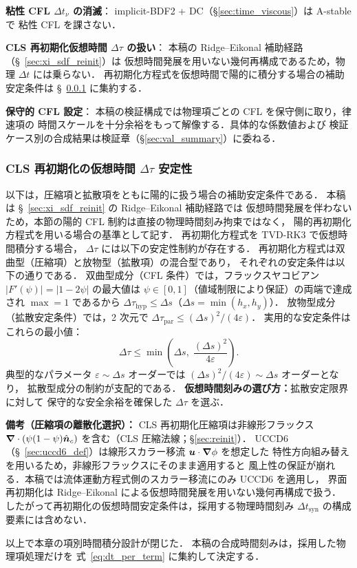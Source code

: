 \textbf{粘性 CFL $\Delta t_\nu$ の消滅}：
implicit-BDF2 + DC（§\ref{sec:time_viscous}）は A-stable で
粘性 CFL を課さない．

\textbf{CLS 再初期化仮想時間 $\Delta\tau$ の扱い}：
本稿の Ridge--Eikonal 補助経路（\S~\ref{sec:xi_sdf_reinit}）は
仮想時間発展を用いない幾何再構成であるため，物理 $\Delta t$ には乗らない．
再初期化方程式を仮想時間で陽的に積分する場合の補助安定条件は
\S~\ref{warn:cls_dtau_stability_v7} に集約する．

\textbf{保守的 CFL 設定}：
本稿の検証構成では物理項ごとの CFL を保守側に取り，律速項の
時間スケールを十分余裕をもって解像する．具体的な係数値および
検証ケース別の合成結果は検証章（§\ref{sec:val_summary}）に委ねる．

\subsubsection{CLS 再初期化の仮想時間 \texorpdfstring{$\Delta\tau$}{Δτ} 安定性}
\label{warn:cls_dtau_stability_v7}
\label{warn:cls_dtau_stability}
以下は，圧縮項と拡散項をともに陽的に扱う場合の補助安定条件である．
本稿は \S~\ref{sec:xi_sdf_reinit} の Ridge--Eikonal 補助経路では
仮想時間発展を伴わないため，本節の陽的 CFL 制約は直接の物理時間刻み拘束ではなく，
陽的再初期化方程式を用いる場合の基準として記す．
再初期化方程式を TVD-RK3 で仮想時間積分する場合，
$\Delta\tau$ には以下の安定性制約が存在する．
再初期化方程式は双曲型（圧縮項）と放物型（拡散項）の混合型であり，
それぞれの安定条件は以下の通りである．
双曲型成分（CFL 条件）では，フラックスヤコビアン $|F'(\psi)| = |1-2\psi|$ の最大値は
$\psi \in [0,1]$（値域制限により保証）の両端で達成され $\max = 1$ であるから
$\Delta\tau_{\mathrm{hyp}} \le \Delta s$（$\Delta s = \min(h_x, h_y)$）．
放物型成分（拡散安定条件）では，2 次元で
$\Delta\tau_{\mathrm{par}} \le (\Delta s)^2/(4\varepsilon)$．
実用的な安定条件はこれらの最小値：
\[
  \Delta\tau \le \min\!\left(\Delta s,\; \frac{(\Delta s)^2}{4\varepsilon}\right).
\]
典型的なパラメータ $\varepsilon \sim \Delta s$ オーダーでは
$(\Delta s)^2/(4\varepsilon) \sim \Delta s$ オーダーとなり，
拡散型成分の制約が支配的である．
\textbf{仮想時間刻みの選び方：}拡散安定限界に対して
保守的な安全余裕を確保した $\Delta\tau$ を選ぶ．

\textbf{備考（圧縮項の離散化選択）：}
CLS 再初期化圧縮項は非線形フラックス $\bm{\nabla}\cdot(\psi(1-\psi)\hat{\bm n}_c)$ を含む（CLS 圧縮法線；§\ref{sec:reinit}）．
UCCD6（\S~\ref{sec:uccd6_def}）は線形スカラー移流 $\bm{u}\cdot\bm{\nabla}\phi$ を想定した
特性方向組み替えを用いるため，非線形フラックスにそのまま適用すると
風上性の保証が崩れる．本稿では流体運動方程式側のスカラー移流にのみ UCCD6 を適用し，
界面再初期化は Ridge--Eikonal による仮想時間発展を用いない幾何再構成で扱う．
したがって再初期化の仮想時間安定条件は，採用する物理時間刻み
$\Delta t_{\mathrm{syn}}$ の構成要素には含めない．

以上で本章の項別時間積分設計が閉じた．
本稿の合成時間刻みは，採用した物理項処理だけを
式~\eqref{eq:dt_per_term} に集約して決定する．
